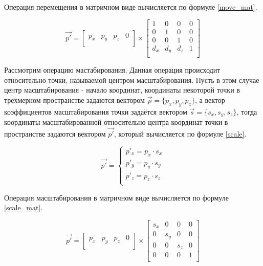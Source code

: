 Операция перемещения в матричном виде вычисляется по формуле \ref{move_mat}.

\begin{equation}\label{move_mat} 
\overrightarrow{p'} = 
\begin{bmatrix}
p_{x} & p_{y} & p_{z} & 0\\
\end{bmatrix}
\times
\begin{bmatrix}
1 & 0 & 0 & 0\\
0 & 1 & 0 & 0\\
0 & 0 & 1 & 0\\
d_{x} & d_{y} & d_{z} & 1\\
\end{bmatrix}
\end{equation}

Рассмотрим операцию мастабирования. Данная операция происходит относительно точки, называемой центром масштабирования. Пусть в этом случае центр масштабирования - начало координат, координаты некоторой точки в трёхмерном пространстве задаются вектором $\overrightarrow{p} = \{p_{x}, p_{y}, p_{z}\}$, а вектор коэффициентов масштабирования точки задаётся вектором $\overrightarrow{s} = \{s_{x}, s_{y}, s_{z}\}$, тогда координаты масштабированной относительно центра координат точки в пространстве задаются вектором $\overrightarrow{p'}$, который вычисляется по формуле \ref{scale}.

\begin{equation}\label{scale} 
\overrightarrow{p'} = 
\begin{cases}
p'_{x} = p_{x} \cdot s_{x}\\
p'_{y} = p_{y} \cdot s_{y}\\
p'_{z} = p_{z} \cdot s_{z}\\
\end{cases}
\end{equation}

Операция масштабирования в матричном виде вычисляется по формуле  \ref{scale_mat}.

\begin{equation}\label{scale_mat} 
\overrightarrow{p'} = 
\begin{bmatrix}
p_{x} & p_{y} & p_{z} & 0\\
\end{bmatrix}
\times
\begin{bmatrix}
s_{x} & 0 & 0 & 0\\
0 & s_{y} & 0 & 0\\
0 & 0 & s_{z} & 0\\
0 & 0 & 0 & 1\\
\end{bmatrix}
\end{equation}

